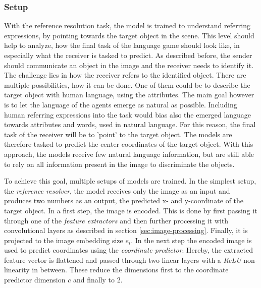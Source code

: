\subsubsection*{Setup}

With the reference resolution task, the model is trained to understand referring expressions, by pointing towards the target object in the scene.
This level should help to analyze, how the final task of the language game should look like, in especially what the receiver is tasked to predict.
As described before, the sender should communicate an object in the image and the receiver needs to identify it.
The challenge lies in how the receiver refers to the identified object.
There are multiple possibilities, how it can be done.
One of them could be to describe the target object with human language, using the attributes.
The main goal however is to let the language of the agents emerge as natural as possible.
Including human referring expressions into the task would bias also the emerged language towards attributes and words, used in natural language.
For this reason, the final task of the receiver will be to 'point' to the target object.
The models are therefore tasked to predict the center coordinates of the target object.
With this approach, the models receive few natural language information, but are still able to rely on all information present in the image to discriminate the objects.

To achieve this goal, multiple setups of models are trained.
In the simplest setup, the \emph{reference resolver}, the model receives only the image as an input and produces two numbers as an output, the predicted x- and y-coordinate of the target object.
In a first step, the image is encoded.
This is done by first passing it through one of the \emph{feature extractors} and then further processing it with convolutional layers as described in section \ref{sec:image-processing}.
Finally, it is projected to the image embedding size $e_i$.
In the next step the encoded image is used to predict coordinates using the \emph{coordinate predictor}.
Hereby, the extracted feature vector is flattened and passed through two linear layers with a \emph{ReLU} non-linearity in between.
These reduce the dimensions first to the coordinate predictor dimension $c$ and finally to 2.

